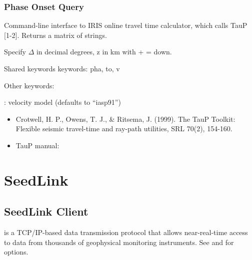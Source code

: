 \documentclass[letterpaper,11pt,english]{sphinxmanual}
\begin{document}
\subsubsection{Phase Onset Query}
\label{\detokenize{src/Web/webclients:phase-onset-query}}
Command-line interface to IRIS online travel time calculator, which calls TauP {[}1-2{]}. Returns a matrix of strings.

Specify \(\Delta\) in decimal degrees, z in km with + = down.

\begin{DUlineblock}{0em}
\item[] Shared keywords keywords: pha, to, v
\item[] Other keywords:
\item[] : velocity model (defaults to “iasp91”)
\end{DUlineblock}

\begin{itemize}
\item {} 
Crotwell, H. P., Owens, T. J., \& Ritsema, J. (1999). The TauP Toolkit: Flexible seismic travel-time and ray-path utilities, SRL 70(2), 154-160.

\item {} 
TauP manual: 

\end{itemize}


\section{SeedLink}
\label{\detokenize{src/Web/seedlink:seedlink}}\label{\detokenize{src/Web/seedlink::doc}}

\subsection{SeedLink Client}
\label{\detokenize{src/Web/seedlink:seedlink-client}}
 is a
TCP/IP-based data transmission protocol that allows near-real-time access to
data from thousands of geophysical monitoring instruments. See
{\hyperref[\detokenize{src/Appendices/keywords:dkw}]{}} and {\hyperref[\detokenize{src/Appendices/web_syntax:cid}]{}} for options.


\begin{fulllineitems}
\end{fulllineitems}
\end{document}
